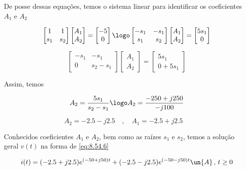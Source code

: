De posse dessas equações, temos o sistema linear para identificar os coeficientes $A_1$ e $A_2$

\begingroup
\renewcommand*{\arraystretch}{1.5}

\[
    \begin{bmatrix}
        1 & 1    \\
        s_1    & s_2
    \end{bmatrix}
    \begin{bmatrix}
        A_1 \\
        A_2
    \end{bmatrix}
    =
    \begin{bmatrix}
        -5 \\
        0
    \end{bmatrix} \logo
    \begin{bmatrix}
        -s_1 & -s_1    \\
        s_1    & s_2
    \end{bmatrix}
    \begin{bmatrix}
        A_1 \\
        A_2
    \end{bmatrix}
    =
    \begin{bmatrix}
        5s_1 \\
        0
    \end{bmatrix}
\]

\[
    \begin{bmatrix}
        -s_1 & -s_1    \\
        0    & s_2 - s_1
    \end{bmatrix}
    \begin{bmatrix}
        A_1 \\
        A_2
    \end{bmatrix}
    =
    \begin{bmatrix}
        5s_1 \\
        0 + 5s_1
    \end{bmatrix}
\]

\endgroup

Assim, temos  

\[ A_2 = \frac{5s_1}{s_2 - s_1} \logo  A_2 = \frac{-250 + j250}{-j100} \] 

\[ A_2 = -2.5 - j2.5 \quad , \quad A_1 = -2.5 + j2.5 \quad  \] 

Conhecidos coeficientes $A_1$ e $A_2$, bem como as raízes $s_1$ e $s_2$, temos a solução geral $v(t)$ na forma de \eqref{eq:8.54.6}

\[ i(t) = (-2.5 + j2.5)e^{(-50 + j50)t} + (-2.5 - j2.5)e^{(-50 - j50)t} \un{A} \, , \, t \geq 0  \]

